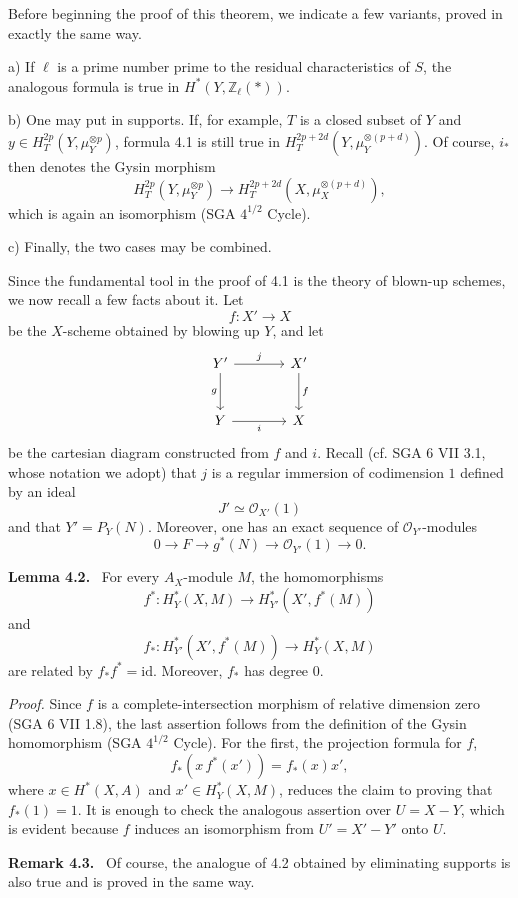 \documentclass[11pt]{article}
\newenvironment{statement}[1]{\par\medskip\noindent\textbf{#1.}\ }{\par\medskip}
\begin{document}
Before beginning the proof of this theorem, we indicate a few variants, proved in exactly the same way.

a) If $\ell$ is a prime number prime to the residual characteristics of $S$, the analogous formula is true in $H^*(Y,\mathbb Z_\ell(*))$.

b) One may put in supports. If, for example, $T$ is a closed subset of $Y$ and $y\in H_T^{2p}(Y,\mu_Y^{\otimes p})$, formula 4.1 is still true in $H_T^{2p+2d}(Y,\mu_Y^{\otimes(p+d)})$. Of course, $i_*$ then denotes the Gysin morphism
\[
H_T^{2p}(Y,\mu_Y^{\otimes p})
\to H_T^{2p+2d}(X,\mu_X^{\otimes(p+d)}),
\]
which is again an isomorphism (SGA $4^{1/2}$ Cycle).

c) Finally, the two cases may be combined.

Since the fundamental tool in the proof of 4.1 is the theory of blown-up schemes, we now recall a few facts about it. Let
\[
f:X'\to X
\]
be the $X$-scheme obtained by blowing up $Y$, and let
\[
\begin{tikzcd}[column sep=large,row sep=large]
Y' \arrow[r,"j"] \arrow[d,"g"'] & X' \arrow[d,"f"]\\
Y \arrow[r,"i"'] & X
\end{tikzcd}
\]
be the cartesian diagram constructed from $f$ and $i$. Recall (cf. SGA 6 VII 3.1, whose notation we adopt) that $j$ is a regular immersion of codimension $1$ defined by an ideal
\[
J'\simeq\mathcal O_{X'}(1)
\]
and that $Y'=P_Y(N)$. Moreover, one has an exact sequence of $\mathcal O_{Y'}$-modules
\[
0\to F\to g^*(N)\to \mathcal O_{Y'}(1)\to0.
\]

\begin{statement}{Lemma 4.2}
For every $A_X$-module $M$, the homomorphisms
\[
f^*:H_Y^*(X,M)\to H_{Y'}^*(X',f^*(M))
\]
and
\[
f_*:H_{Y'}^*(X',f^*(M))\to H_Y^*(X,M)
\]
are related by $f_*f^*=\mathrm{id}$. Moreover, $f_*$ has degree $0$.
\end{statement}

\emph{Proof.} Since $f$ is a complete-intersection morphism of relative dimension zero (SGA 6 VII 1.8), the last assertion follows from the definition of the Gysin homomorphism (SGA $4^{1/2}$ Cycle). For the first, the projection formula for $f$,
\[
f_*(x\,f^*(x'))=f_*(x)x',
\]
where $x\in H^*(X,A)$ and $x'\in H_Y^*(X,M)$, reduces the claim to proving that $f_*(1)=1$. It is enough to check the analogous assertion over $U=X-Y$, which is evident because $f$ induces an isomorphism from $U'=X'-Y'$ onto $U$.

\begin{statement}{Remark 4.3}
Of course, the analogue of 4.2 obtained by eliminating supports is also true and is proved in the same way.
\end{statement}
\end{document}
